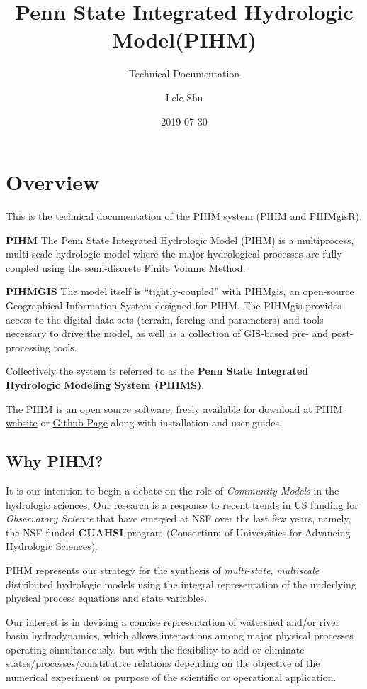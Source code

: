 \documentclass[]{scrbook}
\title{Penn State Integrated Hydrologic Model(PIHM)}
\subtitle{Technical Documentation}
\author{Lele Shu}
\date{2019-07-30}
\begin{document}
\maketitle

{
\setcounter{tocdepth}{1}
\tableofcontents
}
\chapter{Overview}\label{Overview}

This is the technical documentation of the PIHM system (PIHM and
PIHMgisR).

\textbf{PIHM} The Penn State Integrated Hydrologic Model (PIHM) is a
multiprocess, multi-scale hydrologic model where the major hydrological
processes are fully coupled using the semi-discrete Finite Volume
Method.

\textbf{PIHMGIS} The model itself is ``tightly-coupled'' with PIHMgis,
an open-source Geographical Information System designed for PIHM. The
PIHMgis provides access to the digital data sets (terrain, forcing and
parameters) and tools necessary to drive the model, as well as a
collection of GIS-based pre- and post-processing tools.

Collectively the system is referred to as the \textbf{Penn State
Integrated Hydrologic Modeling System (PIHMS)}.

The PIHM is an open source software, freely available for download at
\href{www.pihm.psu.edu}{PIHM website} or
\href{https://github.com/shulele/PIHM++}{Github Page} along with
installation and user guides.

\section{Why PIHM?}\label{why-pihm}

It is our intention to begin a debate on the role of \emph{Community
Models} in the hydrologic sciences. Our research is a response to recent
trends in US funding for \emph{Observatory Science} that have emerged at
NSF over the last few years, namely, the NSF-funded \textbf{CUAHSI}
program (Consortium of Universities for Advancing Hydrologic Sciences).

PIHM represents our strategy for the synthesis of \emph{multi-state},
\emph{multiscale} distributed hydrologic models using the integral
representation of the underlying physical process equations and state
variables.

Our interest is in devising a concise representation of watershed and/or
river basin hydrodynamics, which allows interactions among major
physical processes operating simultaneously, but with the flexibility to
add or eliminate states/processes/constitutive relations depending on
the objective of the numerical experiment or purpose of the scientific
or operational application.
\end{document}
